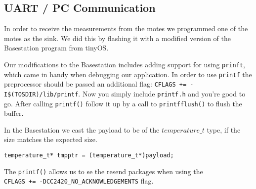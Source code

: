 \subsection{UART / PC Communication}
In order to receive the measurements from the motes we programmed one
of the motes as the sink. We did this by flashing it with a modified
version of the Basestation program from tinyOS.

Our modifications to the Basestation includes adding support for using
\texttt{prinft}, which came in handy when debugging our application.
In order to use \texttt{printf} the preprocessor should be passed an
additional flag: \texttt{CFLAGS += -I\$(TOSDIR)/lib/printf}.  Now you
simply include \texttt{printf.h} and you're good to go. After calling
\texttt{printf()} follow it up by a call to \texttt{printfflush()} to
flush the buffer.

In the Basestation we cast the payload to be of the $temperature\_t$ type, if
the size matches the expected size.

\begin{lstlisting}[caption={BaseStationP.cp casting the payload}]
temperature_t* tmpptr = (temperature_t*)payload;
\end{lstlisting}

The \texttt{printf()} allows us to se the resend packages when using the \\
\texttt{CFLAGS += -DCC2420\_NO\_ACKNOWLEDGEMENTS} flag.

